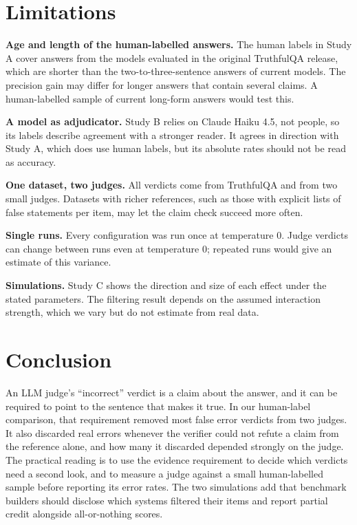 \section{Limitations}
\label{sec:limits}

\textbf{Age and length of the human-labelled answers.} The human labels in Study A cover answers from the models evaluated in the original TruthfulQA release, which are shorter than the two-to-three-sentence answers of current models. The precision gain may differ for longer answers that contain several claims. A human-labelled sample of current long-form answers would test this.

\textbf{A model as adjudicator.} Study B relies on Claude Haiku 4.5, not people, so its labels describe agreement with a stronger reader. It agrees in direction with Study A, which does use human labels, but its absolute rates should not be read as accuracy.

\textbf{One dataset, two judges.} All verdicts come from TruthfulQA and from two small judges. Datasets with richer references, such as those with explicit lists of false statements per item, may let the claim check succeed more often.

\textbf{Single runs.} Every configuration was run once at temperature 0. Judge verdicts can change between runs even at temperature 0; repeated runs would give an estimate of this variance.

\textbf{Simulations.} Study C shows the direction and size of each effect under the stated parameters. The filtering result depends on the assumed interaction strength, which we vary but do not estimate from real data.

\section{Conclusion}
\label{sec:conclusion}

An LLM judge's ``incorrect'' verdict is a claim about the answer, and it can be required to point to the sentence that makes it true. In our human-label comparison, that requirement removed most false error verdicts from two judges. It also discarded real errors whenever the verifier could not refute a claim from the reference alone, and how many it discarded depended strongly on the judge. The practical reading is to use the evidence requirement to decide which verdicts need a second look, and to measure a judge against a small human-labelled sample before reporting its error rates. The two simulations add that benchmark builders should disclose which systems filtered their items and report partial credit alongside all-or-nothing scores.

